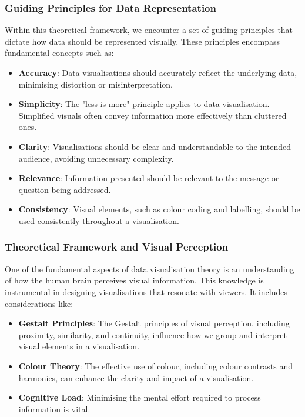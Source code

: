 \documentclass{article}\usepackage[]{graphicx}\usepackage[]{xcolor}
\begin{document}
\subsubsection{Guiding Principles for Data Representation}
Within this theoretical framework, we encounter a set of guiding principles that dictate how data should be represented visually. These principles encompass fundamental concepts such as:
\begin{itemize}
    \item \textbf{Accuracy}: Data visualisations should accurately reflect the underlying data, minimising distortion or misinterpretation.
    \item \textbf{Simplicity}: The "less is more" principle applies to data visualisation. Simplified visuals often convey information more effectively than cluttered ones.
    \item \textbf{Clarity}: Visualisations should be clear and understandable to the intended audience, avoiding unnecessary complexity.
    \item \textbf{Relevance}: Information presented should be relevant to the message or question being addressed.
    \item \textbf{Consistency}: Visual elements, such as colour coding and labelling, should be used consistently throughout a visualisation.
\end{itemize}

\subsubsection{Theoretical Framework and Visual Perception}
One of the fundamental aspects of data visualisation theory is an understanding of how the human brain perceives visual information. This knowledge is instrumental in designing visualisations that resonate with viewers. It includes considerations like:
\begin{itemize}
    \item \textbf{Gestalt Principles}: The Gestalt principles of visual perception, including proximity, similarity, and continuity, influence how we group and interpret visual elements in a visualisation.
    \item \textbf{Colour Theory}: The effective use of colour, including colour contrasts and harmonies, can enhance the clarity and impact of a visualisation.
    \item \textbf{Cognitive Load}: Minimising the mental effort required to process information is vital.
\end{itemize}
\end{document}
